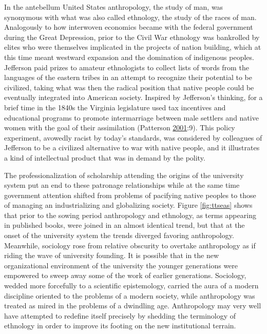 \documentclass[]{book}
\theoremstyle{definition}
\theoremstyle{definition}
\theoremstyle{definition}
\theoremstyle{remark}
\begin{document}
In the antebellum United States anthropology, the study of man, was
synonymous with what was also called ethnology, the study of the races
of man. Analogously to how interwoven economics became with the federal
government during the Great Depression, prior to the Civil War ethnology
was bankrolled by elites who were themselves implicated in the projects
of nation building, which at this time meant westward expansion and the
domination of indigenous peoples. Jefferson paid prizes to amateur
ethnologists to collect lists of words from the languages of the eastern
tribes in an attempt to recognize their potential to be civilized,
taking what was then the radical position that native people could be
eventually integrated into American society. Inspired by Jefferson's
thinking, for a brief time in the 1840s the Virginia legislature used
tax incentives and educational programs to promote intermarriage between
male settlers and native women with the goal of their assimilation
(Patterson \protect\hyperlink{ref-Patterson2001Social}{2001}:9). This
policy experiment, avowedly racist by today's standards, was considered
by colleagues of Jefferson to be a civilized alternative to war with
native people, and it illustrates a kind of intellectual product that
was in demand by the polity.

The professionalization of scholarship attending the origins of the
university system put an end to these patronage relationships while at
the same time government attention shifted from problems of pacifying
native peoples to those of managing an industrializing and globalizing
society. Figure \ref{fig:ttseas} shows that prior to the sowing period
anthropology and ethnology, as terms appearing in published books, were
joined in an almost identical trend, but that at the onset of the
university system the trends diverged favoring anthropology. Meanwhile,
sociology rose from relative obscurity to overtake anthropology as if
riding the wave of university founding. It is possible that in the new
organizational environment of the university the younger generations
were empowered to sweep away some of the work of earlier generations.
Sociology, wedded more forcefully to a scientific epistemology, carried
the aura of a modern discipline oriented to the problems of a modern
society, while anthropology was treated as mired in the problems of a
dwindling age. Anthropology may very well have attempted to redefine
itself precisely by shedding the terminology of ethnology in order to
improve its footing on the new institutional terrain.
\end{document}
